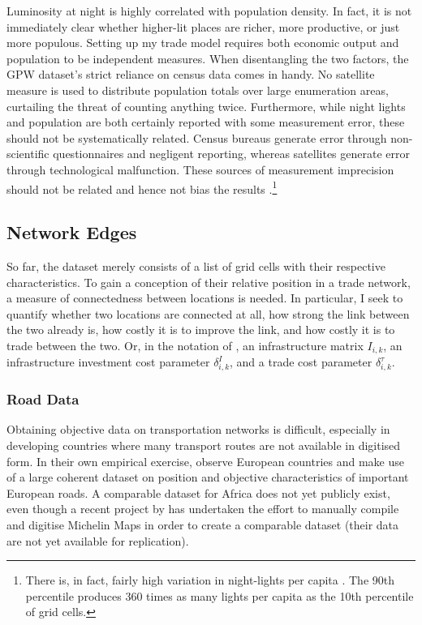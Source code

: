 \documentclass[11pt, oneside]{article}   	%
\begin{document}
Luminosity at night is highly correlated with population density. In fact, it is not immediately clear whether higher-lit places are richer, more productive, or just more populous. Setting up my trade model requires both economic output and population to be independent measures. When disentangling the two factors, the GPW dataset's strict reliance on census data comes in handy. No satellite measure is used to distribute population totals over large enumeration areas, curtailing the threat of counting anything twice. Furthermore, while night lights and population are both certainly reported with some measurement error, these should not be systematically related. Census bureaus generate error through non-scientific questionnaires and negligent reporting, whereas satellites generate error through technological malfunction. These sources of measurement imprecision should not be related and hence not bias the results \citep[see also][]{Pinkovskiy_LightsCameraIncome_2016}.\footnote{There is, in fact, fairly high variation in night-lights per capita \citep[a measure which should be employed with scientific caution and is only reported here for illustrative purposes, see][]{Michalopoulos_SpatialPatternsDevelopment_2018}. The 90th percentile produces 360 times as many lights per capita as the 10th percentile of grid cells.}

\subsection{Network Edges}
So far, the dataset merely consists of a list of grid cells with their respective characteristics. To gain a conception of their relative position in a trade network, a measure of connectedness between locations is needed. In particular, I seek to quantify whether two locations are connected at all, how strong the link between the two already is, how costly it is to improve the link, and how costly it is to trade between the two. Or, in the notation of \cite{fajgelbaum_optimal_2017}, an infrastructure matrix $I_{i,k}$, an infrastructure investment cost parameter $\delta_{i,k}^{I}$, and a trade cost parameter $\delta_{i,k}^{\tau}$.

\subsubsection{Road Data}
\label{sec:road_data}
Obtaining objective data on transportation networks is difficult, especially in developing countries where many transport routes are not available in digitised form. In their own empirical exercise, \citeauthor{fajgelbaum_optimal_2017} observe European countries and make use of a large coherent dataset on position and objective characteristics of important European roads. A comparable dataset for Africa does not yet publicly exist, even though a recent project by \cite{jedwab_average_2017} has undertaken the effort to manually compile and digitise Michelin Maps in order to create a comparable dataset (their data are not yet available for replication).
\end{document}

